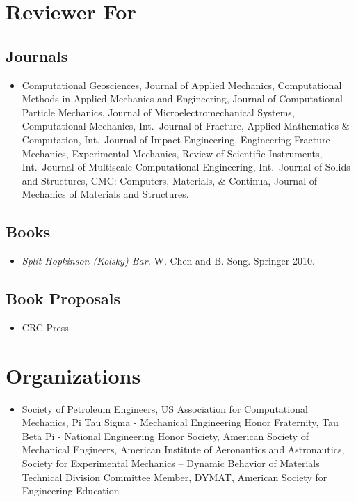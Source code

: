 \section*{Reviewer For}

\subsection*{Journals}

\begin{itemize}
    \item Computational Geosciences, Journal of Applied Mechanics, Computational Methods in Applied Mechanics and Engineering, Journal of Computational Particle Mechanics, Journal of Microelectromechanical Systems, Computational Mechanics, Int.~Journal of Fracture, Applied Mathematics \& Computation, Int.~Journal of Impact Engineering, Engineering Fracture Mechanics, Experimental Mechanics,  Review of Scientific Instruments, Int.~Journal of Multiscale Computational Engineering, Int.~Journal of Solids and Structures, CMC: Computers, Materials, \& Continua, Journal of Mechanics of Materials and Structures.
\end{itemize}

\subsection*{Books}

\begin{itemize}
    \item {\it Split Hopkinson (Kolsky) Bar.}  W. Chen and B. Song.  Springer 2010.
\end{itemize}

\subsection*{Book Proposals}

\begin{itemize}
    \item CRC Press
\end{itemize}

\section*{Organizations}

\begin{itemize}
    \item Society of Petroleum Engineers, US Association for Computational Mechanics, Pi Tau Sigma - Mechanical Engineering Honor Fraternity, Tau Beta Pi - National Engineering Honor Society, American Society of Mechanical Engineers, American Institute of Aeronautics and Astronautics, Society for Experimental Mechanics -- Dynamic Behavior of Materials Technical Division Committee Member, DYMAT, American Society for Engineering Education
\end{itemize}
